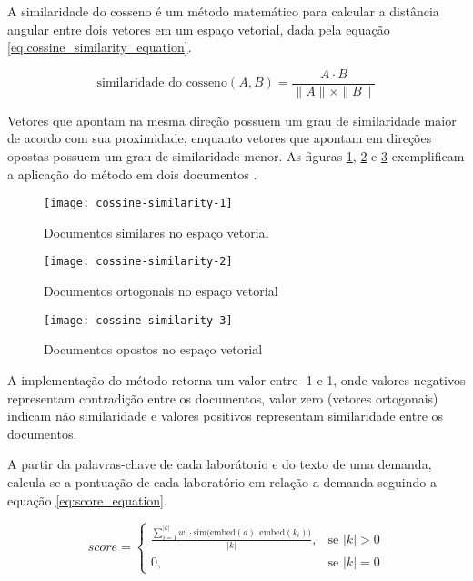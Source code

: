 A similaridade do cosseno é um método matemático para calcular a distância angular entre dois vetores em um espaço vetorial, dada pela equação \ref{eq:cossine_similarity_equation}.

\begin{equation}
    \label{eq:cossine_similarity_equation}
    \text{similaridade do cosseno}(A, B) = \frac{A \cdot B}{\|A\| \times \|B\|}
\end{equation}

Vetores que apontam na mesma direção possuem um grau de similaridade maior de acordo com sua proximidade, enquanto vetores que apontam em direções opostas possuem um grau de similaridade menor. As figuras \ref{fig:cossine_similarity_1}, \ref{fig:cossine_similarity_2} e \ref{fig:cossine_similarity_3} exemplificam a aplicação do método em dois documentos \cite{YlberArtan2022}.

\begin{figure}[H]
    \caption{Documentos similares no espaço vetorial}
    \texttt{[image: cossine-similarity-1]}
    \label{fig:cossine_similarity_1}
\end{figure}

\begin{figure}[H]
    \caption{Documentos ortogonais no espaço vetorial}
    \texttt{[image: cossine-similarity-2]}
    \label{fig:cossine_similarity_2}
\end{figure}

\begin{figure}[H]
    \caption{Documentos opostos no espaço vetorial}
    \texttt{[image: cossine-similarity-3]}
    \label{fig:cossine_similarity_3}
\end{figure}

A implementação do método retorna um valor entre -1 e 1, onde valores negativos representam contradição entre os documentos, valor zero (vetores ortogonais) indicam não similaridade e valores positivos representam similaridade entre os documentos.

A partir da palavras-chave de cada laborátorio e do texto de uma demanda, calcula-se a pontuação de cada laboratório em relação a demanda seguindo a equação \ref{eq:score_equation}.

\begin{equation}
    \label{eq:score_equation}
    score =
    \begin{cases}
        \frac{\sum_{i=1}^{|k|} w_i \cdot \text{sim}\big(\text{embed}(d), \text{embed}(k_i)\big)}{|k|}, & \text{se } |k| > 0 \\
        0,                                                                                             & \text{se } |k| = 0
    \end{cases}
\end{equation}

